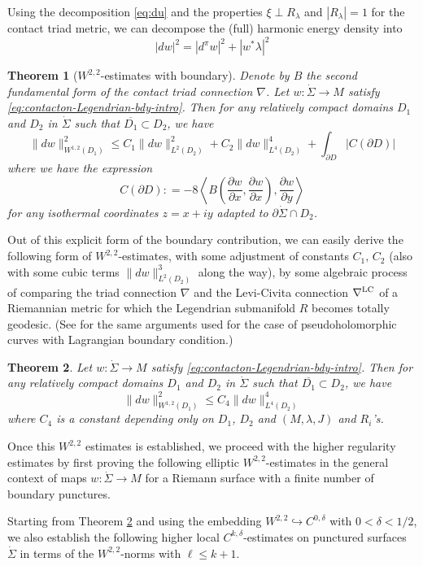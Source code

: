\documentclass[reqno]{amsart}
\newcommand{\del}{\partial}
\newcommand{\be}{\begin{equation}}
\newcommand{\ee}{\end{equation}}
\theoremstyle{theorem}
\newtheorem{thm}{Theorem}[section]
\theoremstyle{definition}
\numberwithin{equation}{section}
\begin{document}
Using the decomposition \eqref{eq:du} and the properties $\xi \perp R_\lambda$ and $|R_\lambda| =1$
for the contact triad metric, we  can decompose the (full) harmonic energy density into
\be\label{eq:|dw|2}
|dw|^2 = |d^\pi w|^2 + |w^*\lambda|^2
\ee
\begin{thm}[$W^{2,2}$-estimates with boundary]\label{eq:W12-with-bdy}
Denote by $B$ the second fundamental form of the contact triad connection $\nabla$.
Let $w: \dot \Sigma\to M$ satisfy \eqref{eq:contacton-Legendrian-bdy-intro}.
Then for any relatively compact domains $D_1$ and $D_2$ in
$\dot\Sigma$ such that $\overline{D_1}\subset D_2$, we have
\be\label{eq:differential-inequality}
\|dw\|^2_{W^{1,2}(D_1)} \leq  C_1 \|dw\|^2_{L^2(D_2)} + C_2 \|dw\|^4_{L^4(D_2)}
+ \int_{\del D}|C(\del D)|
\ee
where we have the expression
\be\label{eq;CdelD}
C(\del D): = - 8 \left\langle B\left(\frac{\del w}{\del x},\frac{\del w}{\del x}\right),\frac{\del w}{\del y}\right \rangle
\ee
for any isothermal coordinates $z = x + iy$ adapted to $\del \dot \Sigma \cap D_2$.
\end{thm}
Out of this explicit form of the boundary contribution, we can easily derive the following
form of $W^{2,2}$-estimates, with some adjustment of constants $C_1, \, C_2$
(also with some cubic terms $\|dw\|^3_{L^2(D_2)}$ along the way), by some algebraic process of comparing the triad connection
$\nabla$ and the Levi-Civita connection $\nabla^{\text{\rm LC}}$ of a Riemannian metric
for which the Legendrian submanifold $R$ becomes totally geodesic. (See \cite[Section 8.2 \& 8.3]{oh:book1}
for the same arguments used for the case of pseudoholomorphic curves with Lagrangian boundary condition.)

\begin{thm}\label{thm:local-W12-intro}
Let $w: \dot \Sigma \to M$ satisfy \eqref{eq:contacton-Legendrian-bdy-intro}.
Then for any relatively compact domains $D_1$ and $D_2$ in
$\dot\Sigma$ such that $\overline{D_1}\subset D_2$, we have
$$
\|dw\|^2_{W^{1,2}(D_1)}\leq  C_4 \|dw\|^4_{L^4(D_2)}
$$
where $C_4$ is a constant depending only on $D_1$, $D_2$ and $(M,\lambda, J)$ and $R_i$'s.
\end{thm}

Once this $W^{2,2}$ estimates is established, we proceed with the higher regularity
estimates by first proving the following elliptic $W^{2,2}$-estimates in the general context of
maps $w: \dot \Sigma \to M$ for a Riemann surface with a finite number of boundary punctures.

Starting from Theorem \ref{thm:local-W12-intro} and using
the embedding $W^{2,2} \hookrightarrow C^{0,\delta}$ with $0 < \delta < 1/2$,
we also establish the following higher local $C^{k,\delta}$-estimates on punctured surfaces
$\dot \Sigma$ in terms of the $W^{2,2}$-norms with $\ell \leq k+1$.
\end{document}
